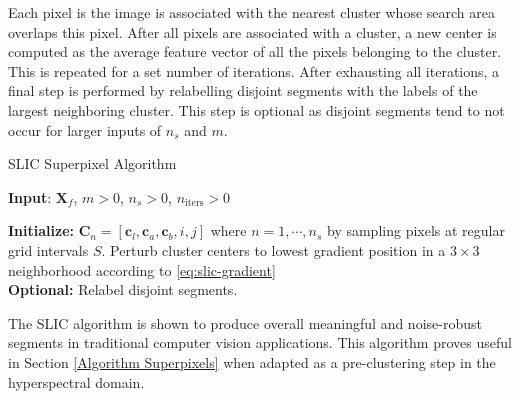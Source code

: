 Each pixel is the image is associated with the nearest cluster whose search area overlaps this pixel. After all pixels are associated with a cluster, a new center is computed as the average feature vector of all the pixels belonging to the cluster. This is repeated for a set number of iterations. After exhausting all iterations, a final step is performed by relabelling disjoint segments with the labels of the largest neighboring cluster. This step is optional as disjoint segments tend to not occur for larger inputs of $n_s$ and $m$.

\begin{algorithm}
    \caption{SLIC Superpixel Algorithm}
    
    \textbf{Input}: $\mathbf{X}_f$, $m > 0$, $n_s > 0$, $n_{\text{iters}} > 0$

    \textbf{Initialize:} $\mathbf{C}_n = [\mathbf{c}_{l}, \mathbf{c}_{a}, \mathbf{c}_{b}, i, j]$ where $n = 1, \cdots, n_s$ by sampling pixels at regular grid intervals $S$. Perturb cluster centers to lowest gradient position in a $3 \times 3$ neighborhood according to \eqref{eq:slic-gradient} \\
    
    \textbf{Optional:} Relabel disjoint segments.
\end{algorithm}

The SLIC algorithm is shown to produce overall meaningful and noise-robust segments in traditional computer vision applications. This algorithm proves useful in Section \ref{Algorithm Superpixels} when adapted as a pre-clustering step in the hyperspectral domain.
